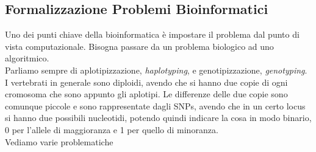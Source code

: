 \documentclass[a4paper,12pt, oneside]{book}
\begin{document}
\subsection{Formalizzazione Problemi Bioinformatici}
Uno dei punti chiave della bioinformatica è impostare il problema dal punto di
vista computazionale. Bisogna passare da un problema biologico ad uno
algoritmico. \\
Parliamo sempre di aplotipizzazione, \textit{haplotyping}, e
genotipizzazione, \textit{genotyping}.\\
I vertebrati in generale sono diploidi, avendo che si hanno due copie di ogni
cromosoma che sono appunto gli aplotipi. Le differenze delle due copie sono
comunque piccole e sono rappresentate dagli SNPs, avendo che in un certo locus
si hanno due possibili nucleotidi, potendo quindi indicare la cosa in modo
binario, 0 per l'allele di maggioranza e 1 per quello di minoranza.\\
Vediamo varie problematiche
\end{document}
